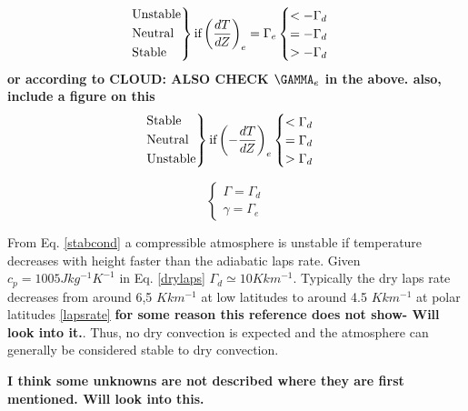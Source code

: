 \begin{equation}
    \begin{rcases}
      \text{Unstable}\\
      \text{Neutral}\\
      \text{Stable}
    \end{rcases}   
    \text{if} \left(\frac{dT}{dZ}\right)_e = \Gamma_e 
    \begin{cases}
      < - \Gamma_d \\
      = - \Gamma_d \\
      > - \Gamma_d
    \end{cases}
    \label{stabcond}
\end{equation}
\textbf{or according to CLOUD: ALSO CHECK $\GAMMA_e$ in the above. also, include a figure on this}
\begin{equation}
    \begin{rcases}
      \text{Stable}\\
      \text{Neutral}\\
      \text{Unstable}
    \end{rcases}   
    \text{if} \left(-\frac{dT}{dZ}\right)_e 
    \begin{cases}
      < \Gamma_d \\
      = \Gamma_d \\
      > \Gamma_d
    \end{cases}
\end{equation}

\begin{equation}
    \begin{cases}
        \Gamma = \Gamma_d \\
        \gamma = \Gamma_e
    \end{cases}
\end{equation}

From Eq. \eqref{stabcond} a compressible atmosphere is unstable if temperature decreases with height faster than the adiabatic laps rate. Given $c_p = 1005 Jkg^{-1}K^{-1}$ in Eq. \eqref{drylaps} $\Gamma_d \simeq 10 K km^{-1}$. Typically the dry laps rate decreases from around 6,5 $K km^{-1}$ at low latitudes to around 4.5 $K km^{-1}$ at polar latitudes \ref{lapsrate} \textbf{for some reason this reference does not show- Will look into it.}. Thus, no dry convection is expected and the atmosphere can generally be considered stable to dry convection.     

\textbf{I think some unknowns are not described where they are first mentioned. Will look into this.}

